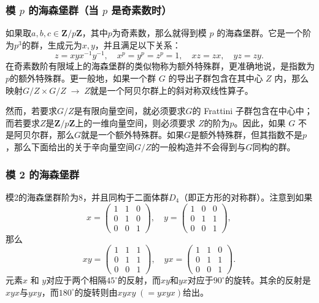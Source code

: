 \subsubsection{模 $p$ 的海森堡群（当 $p$ 是奇素数时）}
如果取$a, b, c \in \mathbf{Z}/p\mathbf{Z}$，其中$p$为奇素数，那么就得到模 $p$ 的海森堡群。它是一个阶为$p^{3}$的群，生成元为$x, y$，并且满足以下关系：
$$
z = x y x^{-1} y^{-1}, \quad x^{p} = y^{p} = z^{p} = 1, \quad xz = zx, \quad yz = zy.~
$$
在奇素数阶有限域上的海森堡群的类似物称为额外特殊群，更准确地说，是指数为 $p$的额外特殊群。更一般地，如果一个群 $G$ 的导出子群包含在其中心 $Z$ 内，那么映射$G/Z \times G/Z \;\to\; Z$就是一个阿贝尔群上的斜对称双线性算子。

然而，若要求$G/Z$是有限向量空间，就必须要求$G$的 Frattini 子群包含在中心中；而若要求$Z$是$\mathbf{Z}/p\mathbf{Z}$上的一维向量空间，则必须要求 $Z$的阶为$p$。因此，如果 $G$ 不是阿贝尔群，那么$G$就是一个额外特殊群。如果$G$是额外特殊群，但其指数不是$p$，那么下面给出的关于辛向量空间$G/Z$的一般构造并不会得到与$G$同构的群。
\subsubsection{模 2 的海森堡群}
模2的海森堡群阶为8，并且同构于二面体群$D_{4}$（即正方形的对称群）。注意到如果
$$
x = \begin{pmatrix}
1 & 1 & 0 \\
0 & 1 & 0 \\
0 & 0 & 1
\end{pmatrix}, \quad
y = \begin{pmatrix}
1 & 0 & 0 \\
0 & 1 & 1 \\
0 & 0 & 1
\end{pmatrix},~
$$
那么
$$
xy = \begin{pmatrix}
1 & 1 & 1 \\
0 & 1 & 1 \\
0 & 0 & 1
\end{pmatrix}, \quad
yx = \begin{pmatrix}
1 & 1 & 0 \\
0 & 1 & 1 \\
0 & 0 & 1
\end{pmatrix}.~
$$
元素$x$ 和 $y$对应于两个相隔$45^\circ$的反射，而$xy$和$yx$对应于$90^\circ$的旋转。其余的反射是$xyx$与$yxy$，而$180^\circ$的旋转则由$xyxy \; (= yxyx)$给出。
